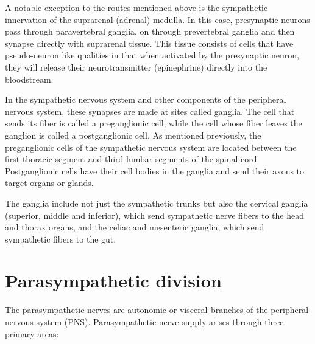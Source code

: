 A notable exception to the routes mentioned above is the sympathetic innervation of the suprarenal (adrenal) medulla. In this case, presynaptic neurons pass through paravertebral ganglia, on through prevertebral ganglia and then synapse directly with suprarenal tissue. This tissue consists of cells that have pseudo-neuron like qualities in that when activated by the presynaptic neuron, they will release their neurotransmitter (epinephrine) directly into the bloodstream.

In the sympathetic nervous system and other components of the peripheral nervous system, these synapses are made at sites called ganglia. The cell that sends its fiber is called a preganglionic cell, while the cell whose fiber leaves the ganglion is called a postganglionic cell. As mentioned previously, the preganglionic cells of the sympathetic nervous system are located between the first thoracic segment and third lumbar segments of the spinal cord. Postganglionic cells have their cell bodies in the ganglia and send their axons to target organs or glands.

The ganglia include not just the sympathetic trunks but also the cervical ganglia (superior, middle and inferior), which send sympathetic nerve fibers to the head and thorax organs, and the celiac and mesenteric ganglia, which send sympathetic fibers to the gut.

\hypertarget{parasympathetic-division}{%
\section{Parasympathetic division}\label{parasympathetic-division}}

The parasympathetic nerves are autonomic or visceral  branches of the peripheral nervous system (PNS). Parasympathetic nerve supply arises through three primary areas:

